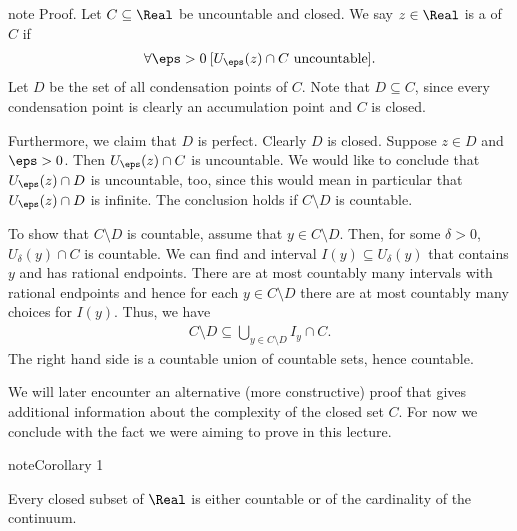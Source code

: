 \documentclass[letterpaper,10pt,english]{jupyterBook}
\begin{document}
\begin{sphinxadmonition}{note}
\sphinxAtStartPar
Proof. Let \(C \subseteq \Real\) be uncountable and closed. We say \(z \in \Real\) is a  of \(C\) if
\begin{equation*}
\begin{split}
    \forall \eps > 0 \:[ U_\eps(z) \cap C \text{ uncountable}].
\end{split}
\end{equation*}
\sphinxAtStartPar
Let \(D\) be the set of all condensation points of \(C\). Note that \(D \subseteq C\), since every condensation point is clearly an accumulation point and \(C\) is closed.

\sphinxAtStartPar
Furthermore, we claim that \(D\) is perfect. Clearly \(D\) is closed. Suppose \(z \in D\) and \(\eps > 0\). Then \(U_\eps(z) \cap C\) is uncountable. We would like to conclude that \(U_\eps(z) \cap D\) is uncountable, too, since this would mean in particular that \(U_\eps(z) \cap D\) is infinite. The conclusion holds if \(C \setminus D\) is countable.

\sphinxAtStartPar
To show that \(C\setminus D\) is countable, assume that \(y \in C \setminus D\). Then, for some \(\delta > 0\),  \(U_\delta(y) \cap C\) is countable. We can find and interval \(I(y) \subseteq U_\delta(y)\) that contains \(y\) and has rational endpoints. There are at most countably many intervals with rational endpoints and hence for each \(y \in C \setminus D\) there are at most countably many choices for \(I(y)\). Thus, we have
\begin{equation*}
\begin{split}
    C\setminus D \subseteq \bigcup_{y \in C \setminus D} I_y \cap C.
\end{split}
\end{equation*}
\sphinxAtStartPar
The right hand side is a countable union of countable sets, hence countable.
\end{sphinxadmonition}

\sphinxAtStartPar
We will later encounter an alternative (more constructive) proof that gives additional information about the complexity of the closed set \(C\). For now we conclude with the fact we were aiming to prove in this lecture.
\label{perfect_subsets_R:corollary-3}
\begin{sphinxadmonition}{note}{Corollary 1}



\sphinxAtStartPar
Every closed subset of \(\Real\) is either countable or of the cardinality of the continuum.
\end{sphinxadmonition}
\end{document}
